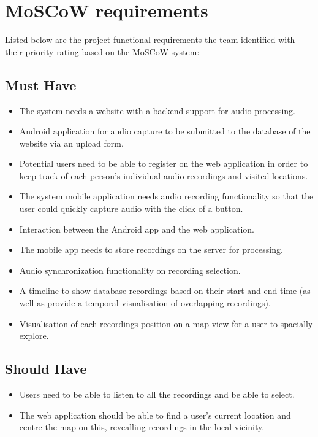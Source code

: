 \documentclass{l3proj}
\begin{document}
\section{MoSCoW requirements}
Listed below are the project functional requirements the team identified with their priority rating based on the MoSCoW system:

\subsection{Must Have}
	\begin{itemize}
	\item{  The system needs a website with a backend support for audio processing.}
	\item{  Android application for audio capture to be submitted to the database of the website via an upload form.}
	\item{  Potential users need to be able to register on the web application in order to keep track of each person's individual audio recordings and visited locations.}
	\item{  The system mobile application needs audio recording functionality so that the user could quickly capture audio with the click of a button.}
	\item{  Interaction between the Android app and the web application.}
	\item{  The mobile app needs to store recordings on the server for processing.}
	\item{  Audio synchronization functionality on recording selection.}
	\item{  A timeline to show database recordings based on their start and end time (as well as provide a temporal visualisation of overlapping recordings).}
	\item{  Visualisation of each recordings position on a map view for a user to spacially explore.}
	\end{itemize}

\subsection{Should Have}
	\begin{itemize}
	\item{  Users need to be able to listen to all the recordings and be able to select.}
	\item{  The web application should be able to find a user's current location and centre the map on this, revealling recordings in the local vicinity.}
	\end{itemize}
\end{document}
